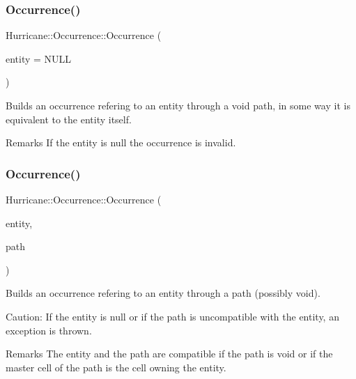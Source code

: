\subsubsection{\texorpdfstring{Occurrence()}{Occurrence()}\hspace{0.1cm}{\footnotesize\ttfamily [1/3]}}
{\footnotesize\ttfamily Hurricane\+::\+Occurrence\+::\+Occurrence (\begin{DoxyParamCaption}\item[{const \mbox{\hyperlink{classHurricane_1_1Entity}{Entity}} $\ast$}]{entity = {\ttfamily NULL} }\end{DoxyParamCaption})}

Builds an occurrence refering to an entity through a void path, in some way it is equivalent to the entity itself.

\begin{DoxyRemark}{Remarks}
If the entity is null the occurrence is invalid. 
\end{DoxyRemark}
\mbox{\label{classHurricane_1_1Occurrence_afedb5d75781a9a4f0a19d37f0e8c88a8}} 
\subsubsection{\texorpdfstring{Occurrence()}{Occurrence()}\hspace{0.1cm}{\footnotesize\ttfamily [2/3]}}
{\footnotesize\ttfamily Hurricane\+::\+Occurrence\+::\+Occurrence (\begin{DoxyParamCaption}\item[{const \mbox{\hyperlink{classHurricane_1_1Entity}{Entity}} $\ast$}]{entity,  }\item[{const \mbox{\hyperlink{classHurricane_1_1Path}{Path}} \&}]{path }\end{DoxyParamCaption})}

Builds an occurrence refering to an entity through a path (possibly void).

\begin{DoxyParagraph}{Caution\+: If the entity is null or if the path is uncompatible with the }
entity, an exception is thrown.
\end{DoxyParagraph}
\begin{DoxyRemark}{Remarks}
The entity and the path are compatible if the path is void or if the master cell of the path is the cell owning the entity. 
\end{DoxyRemark}
\mbox{\label{classHurricane_1_1Occurrence_affec5f25b9c2efa2bcde02e9c4833626}} 
